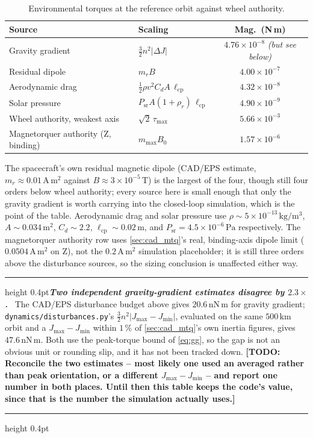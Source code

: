 \documentclass[conference,10pt,a4paper]{IEEEtran}
\newcommand{\remarkrule}{\par\nobreak\vspace{2pt}%
  \hrule height 0.4pt\vspace{4pt}\nobreak}
\newenvironment{cautionbox}[1][Caveat]
  {\par\medskip\remarkrule\noindent\small\textbf{\textit{#1.}}\ \ignorespaces}
  {\par\vspace{3pt}\hrule height 0.4pt\par\medskip\ignorespacesafterend}
\newcommand{\TODO}[1]{\textbf{[TODO: #1]}}
\newcommand{\NOTE}[1]{{\small\textit{(#1)}}}
\newcommand{\TODO}[1]{}
\newcommand{\NOTE}[1]{}
\newcommand{\unit}[1]{\ensuremath{\,\mathrm{#1}}}
\begin{document}
\begin{table}[!t]
\centering
\caption{Environmental torques at the reference orbit against wheel authority.}
\label{tab:disturbances}
\footnotesize
\begin{tabular}{@{}llc@{}}
\toprule
\textbf{Source} & \textbf{Scaling} & \textbf{Mag.\ (N\,m)} \\
\midrule
Gravity gradient & $\tfrac{3}{2}n^2|\Delta J|$ & $4.76\times10^{-8}$ \NOTE{but see below} \\
Residual dipole  & $m_r B$                     & $4.00\times10^{-7}$ \\
Aerodynamic drag & $\tfrac{1}{2}\rho v^2 C_d A\,\ell_\text{cp}$ & $4.32\times10^{-8}$ \\
Solar pressure   & $P_\text{sr}A(1{+}\rho_r)\,\ell_\text{cp}$   & $4.90\times10^{-9}$ \\
\midrule
Wheel authority, weakest axis & $\sqrt2\,\tau_\text{max}$ & $5.66\times10^{-3}$ \\
Magnetorquer authority (Z, binding) & $m_\text{max}B_0$ & $1.57\times10^{-6}$ \\
\bottomrule
\end{tabular}
\end{table}

The spacecraft's own residual magnetic dipole (CAD/EPS estimate,
$m_r\approx0.01\unit{A\,m^2}$ against $B\approx3\times10^{-5}\unit{T}$) is the
largest of the four, though still four orders below wheel authority; every
source here is small enough that only the gravity gradient is worth carrying
into the closed-loop simulation, which is the point of the table. Aerodynamic
drag and solar pressure use $\rho\sim5\times10^{-13}\unit{kg/m^3}$,
$A\sim0.034\unit{m^2}$, $C_d\sim2.2$, $\ell_\text{cp}\sim0.02\unit{m}$, and
$P_\text{sr}=4.5\times10^{-6}\unit{Pa}$ respectively. The magnetorquer
authority row uses \cref{sec:cad_mtq}'s real, binding-axis dipole limit
($0.0504\unit{A\,m^2}$ on Z), not the $0.2\unit{A\,m^2}$ simulation placeholder;
it is still three orders above the disturbance sources, so the sizing
conclusion is unaffected either way.

\begin{cautionbox}[Two independent gravity-gradient estimates disagree by $2.3\times$]
The CAD/EPS disturbance budget above gives $20.6\unit{nN\,m}$ for gravity
gradient; \texttt{dynamics/disturbances.py}'s
$\tfrac{3}{2}n^2|J_\text{max}-J_\text{min}|$, evaluated on the same $500\unit{km}$
orbit and a $J_\text{max}-J_\text{min}$ within $1\,\%$ of \cref{sec:cad_mtq}'s
own inertia figures, gives $47.6\unit{nN\,m}$. Both use the peak-torque bound
of \cref{eq:gg}, so the gap is not an obvious unit or rounding slip, and it has
not been tracked down. \TODO{Reconcile the two estimates -- most likely one
used an averaged rather than peak orientation, or a different $J_\text{max}-J_
\text{min}$ -- and report one number in both places. Until then this table
keeps the code's value, since that is the number the simulation actually
uses.}
\end{cautionbox}
\end{document}
